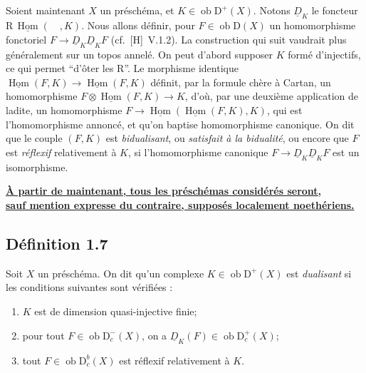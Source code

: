 \documentclass[11pt]{article}
\DeclareMathOperator{\Hom}{Hom}
\newcommand{\R}{\mathrm{R}}\newcommand{\RHomCore}{\mathrm{RHom}}
\newcommand{\D}{\mathrm{D}}
\newcommand{\ob}{\operatorname{ob}}
\providecommand{\Hom}{\operatorname{Hom}}
\providecommand{\ob}{\operatorname{ob}}
\providecommand{\R}{\mathrm R}
\providecommand{\Hom}{\operatorname{Hom}}
\begin{document}
Soient maintenant $X$ un préschéma, et $K \in \ob \D^{+}(X)$. Notons $\underline{D}_K$ le foncteur $\R\,\underline{\Hom}(\quad, K)$. Nous allons définir, pour $F \in \ob \D(X)$ un homomorphisme fonctoriel $F \to \underline{D}_K \underline{D}_K F$ (cf.~[H]~V.1.2). La construction qui suit vaudrait plus généralement sur un topos annelé. On peut d'abord supposer $K$ formé d'injectifs, ce qui permet ``d'ôter les $\R$''. Le morphisme identique $\underline{\Hom}(F,K) \to \underline{\Hom}(F,K)$ définit, par la formule chère à Cartan, un homomorphisme $F \otimes \underline{\Hom}(F,K) \to K$, d'où, par une deuxième application de ladite, un homomorphisme $F \to \underline{\Hom}(\underline{\Hom}(F,K), K)$, qui est l'homomorphisme annoncé, et qu'on baptise homomorphisme canonique. On dit que le couple $(F,K)$ est \emph{bidualisant}, ou \emph{satisfait à la bidualité}, ou encore que $F$ est \emph{réflexif} relativement à $K$, si l'homomorphisme canonique $F \to \underline{D}_K \underline{D}_K F$ est un isomorphisme.

\noindent\textbf{\underline{À partir de maintenant, tous les préschémas considérés seront,}}\\[-0.1em]\textbf{\underline{sauf mention expresse du contraire, supposés localement noethériens.}}

\subsection*{Définition 1.7}
Soit $X$ un préschéma. On dit qu'un complexe $K \in \ob \D^{+}(X)$ est \emph{dualisant} si les conditions suivantes sont vérifiées :
\begin{enumerate}[label=(\roman*)]
\item $K$ est de dimension quasi-injective finie;
\item pour tout $F \in \ob \D_c^{-}(X)$, on a $\underline{D}_K(F) \in \ob \D_c^{+}(X)$;
\item tout $F \in \ob \D_c^{b}(X)$ est réflexif relativement à $K$.
\end{enumerate}
\end{document}
